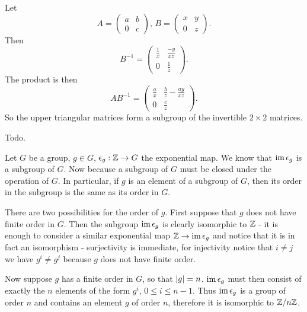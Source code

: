 \begin{solution}
	Let \[
		A = 
			\begin{pmatrix}
				a & b \\
				0 & c
			\end{pmatrix}
		\text{, }
		B = 
			\begin{pmatrix}
				x & y \\
				0 & z
			\end{pmatrix}
		\text{.}
	\] 
	Then \[
		B^{-1} =
			\begin{pmatrix}
			\frac{1}{x} & \frac{-y}{xz} \\
			0 & \frac{1}{z}
			\end{pmatrix}
		\text{.}
	\]
	The product is then \[
		A B^{-1} =
			\begin{pmatrix}
			\frac{a}{x} & \frac{b}{z} - \frac{ay}{xz} \\
			0 & \frac{c}{z}
			\end{pmatrix}
		\text{.}
	\]
	So the upper triangular matrices form a subgroup of the invertible $2 \times 2$ matrices.
\end{solution}

\begin{problem}
\end{problem}

\begin{solution}
	Todo.
\end{solution}

\begin{problem}
\end{problem}

\begin{solution}
	Let $G$ be a group, $g \in G$, $\epsilon_g: \mathbb{Z} \to G$ the exponential map. We know that $\operatorname{im} \epsilon_g$ is a subgroup of $G$. Now because a subgroup of $G$ must be closed under the operation of $G$. In particular, if $g$ is an element of a subgroup of $G$, then its order in the subgroup is the same as its order in $G$.
	
	There are two possibilities for the order of $g$. First suppose that $g$ does not have finite order in $G$. Then the subgroup $\operatorname{im} \epsilon_g$ is clearly isomorphic to $\mathbb{Z}$ - it is enough to consider a similar exponential map $\mathbb{Z} \to \operatorname{im} \epsilon_g$ and notice that it is in fact an isomorphism - surjectivity is immediate, for injectivity notice that $i \neq j$ we have $g^i \neq g^j$ because $g$ does not have finite order.
	
	Now suppose $g$ has a finite order in $G$, so that $\left|g\right| = n$. $\operatorname{im} \epsilon_g$ must then consist of exactly the $n$ elements of the form $g^i$, $0 \leq i \leq n - 1$. Thus $\operatorname{im} \epsilon_g$ is a group of order $n$ and contains an element $g$ of order $n$, therefore it is isomorphic to $\mathbb{Z}/n\mathbb{Z}$.
\end{solution}

